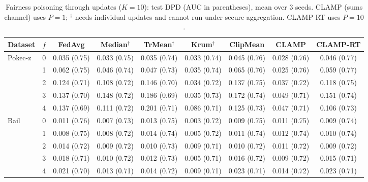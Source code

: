 \begin{table}[tbp]
\centering
\scriptsize
\setlength{\tabcolsep}{3pt}
\caption{Fairness poisoning through updates ($K=10$): test DPD (AUC in parentheses), mean over 3 seeds. CLAMP (sums channel) uses $P=1$; $^\dagger$ needs individual updates and cannot run under secure aggregation. CLAMP-RT uses $P=10$.}
\label{tab:e3}
\begin{adjustbox}{max width=\textwidth}
\begin{tabular}{lcccccccc}
\toprule
Dataset & $f$ & FedAvg & Median$^\dagger$ & TrMean$^\dagger$ & Krum$^\dagger$ & ClipMean & CLAMP & CLAMP-RT \\
\midrule
Pokec-z & 0 & 0.035 (0.75) & 0.033 (0.75) & 0.035 (0.74) & 0.033 (0.74) & 0.045 (0.76) & 0.028 (0.76) & 0.046 (0.77) \\
 & 1 & 0.062 (0.75) & 0.046 (0.74) & 0.047 (0.73) & 0.035 (0.74) & 0.065 (0.76) & 0.025 (0.76) & 0.059 (0.77) \\
 & 2 & 0.124 (0.71) & 0.108 (0.72) & 0.146 (0.70) & 0.034 (0.72) & 0.137 (0.75) & 0.037 (0.72) & 0.118 (0.75) \\
 & 3 & 0.137 (0.70) & 0.148 (0.72) & 0.186 (0.69) & 0.035 (0.73) & 0.172 (0.74) & 0.049 (0.71) & 0.151 (0.74) \\
 & 4 & 0.137 (0.69) & 0.111 (0.72) & 0.201 (0.71) & 0.086 (0.71) & 0.125 (0.73) & 0.047 (0.71) & 0.106 (0.73) \\
\midrule
Bail & 0 & 0.011 (0.76) & 0.007 (0.73) & 0.013 (0.75) & 0.003 (0.72) & 0.009 (0.75) & 0.011 (0.75) & 0.009 (0.74) \\
 & 1 & 0.008 (0.75) & 0.008 (0.72) & 0.014 (0.74) & 0.005 (0.72) & 0.011 (0.74) & 0.012 (0.74) & 0.010 (0.74) \\
 & 2 & 0.014 (0.72) & 0.009 (0.72) & 0.010 (0.73) & 0.009 (0.71) & 0.010 (0.72) & 0.011 (0.72) & 0.009 (0.72) \\
 & 3 & 0.018 (0.71) & 0.010 (0.72) & 0.012 (0.73) & 0.005 (0.71) & 0.016 (0.72) & 0.009 (0.72) & 0.015 (0.71) \\
 & 4 & 0.021 (0.70) & 0.013 (0.71) & 0.014 (0.72) & 0.009 (0.71) & 0.023 (0.71) & 0.014 (0.72) & 0.023 (0.71) \\
\bottomrule
\end{tabular}
\end{adjustbox}
\end{table}
